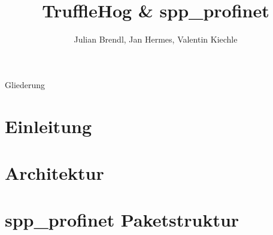 \documentclass[18pt]{beamer}
\title[TruffleHog \& spp\_profinet]{TruffleHog \& spp\_profinet}
\author{Julian Brendl, Jan Hermes, Valentin Kiechle}
\institute{Fraunhofer IOSB}
\begin{document}

\begin{frame}
	\titlepage
\end{frame}

\begin{frame}{Gliederung}
	\tableofcontents
\end{frame}

\section{Einleitung}
	

\section{Architektur}
	
	
	
	
	
	
	
	
	
	
	
	
	
	
	
	
	
	
	
	

\section{spp\_profinet Paketstruktur}
	
	
	
	
	
	
	
	
	
	
	
	
	
	
	
	
	
	
	
	
	
\end{document}
